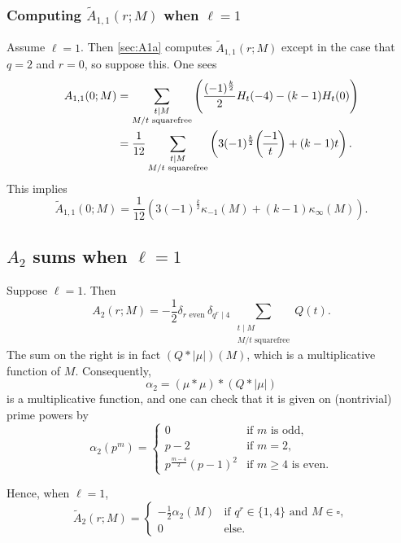 \documentclass[11pt]{amsart}
\newcommand{\leg}{\overwithdelims ()}
\numberwithin{lem}{section}
\theoremstyle{remark}
\theoremstyle{definition}
\numberwithin{equation}{section}
\begin{document}
\subsubsection{Computing $\tilde A_{1,1}(r;M)$ when $\ell = 1$}
Assume $\ell = 1$.  Then \cref{sec:A1a} computes $\tilde A_{1,1}(r;M)$ except in the case that $q=2$ and $r=0$, so suppose this.  One sees
\begin{align*} A_{1,1}(0; M) &= \sum_{\substack{t \mid M \\ M/t \text{ squarefree}}} 
\left( \frac{(-1)^{\frac k2}}2 H_t(-4) -  (k-1) H_t(0) \right) \\
&= \frac 1{12} \sum_{\substack{t \mid M \\ M/t \text{ squarefree}}} 
\left( 3 {(-1)^{\frac k2}} {-1 \leg t} +  (k-1) t \right).
\end{align*}
This implies
\begin{equation}
\tilde A_{1,1}(0; M) = \frac 1{12}  
\left( 3 {(-1)^{\frac k2}} \kappa_{-1}(M) +  (k-1) \kappa_\infty(M) \right).
\end{equation}

\subsection{$A_2$ sums when $\ell = 1$}

Suppose $\ell = 1$.  Then
\[ A_2(r; M) = - \frac 12 \delta_{r \text{ even}} \, \delta_{q^r \mid 4} \,  \sum_{\substack{t \mid M \\ M/t \text{ squarefree}}} Q(t).  \]
The sum on the right is in fact $(Q * |\mu|)(M)$, which is a multiplicative function of $M$.  Consequently,
\[ \alpha_2 = (\mu * \mu) * (Q * | \mu |) \]
is a multiplicative function, and one can check that it is given on (nontrivial) prime powers by
\[ \alpha_2(p^m) = 
\begin{cases}
0 & \text{if }m \text{ is odd}, \\
p-2 & \text{if }m = 2,  \\
p^{\frac{m-4}2}(p-1)^2 & \text{if }m \ge 4 \text{ is even}.
\end{cases} \]

Hence, when $\ell = 1$,
\begin{equation}
\tilde A_2(r;M) =
\begin{cases}
- \frac 12 \alpha_2(M) & \text{if } q^r \in \{ 1, 4 \} \text{ and } M \in \square, \\
0 & \text{else}.
\end{cases}
\end{equation}
\end{document}
